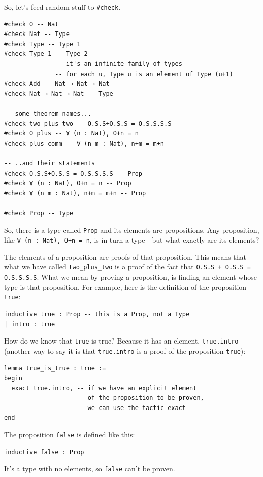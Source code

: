 \documentclass[oneside]{book}
\theoremstyle{definition}
\theoremstyle{remark}
\theoremstyle{plain}
\begin{document}
So, let's feed random stuff to \lstinline{#check}.
\begin{lstlisting}
#check O -- Nat
#check Nat -- Type
#check Type -- Type 1
#check Type 1 -- Type 2
              -- it's an infinite family of types
              -- for each u, Type u is an element of Type (u+1)
#check Add -- Nat → Nat → Nat
#check Nat → Nat → Nat -- Type

-- some theorem names...
#check two_plus_two -- O.S.S+O.S.S = O.S.S.S.S
#check O_plus -- ∀ (n : Nat), O+n = n
#check plus_comm -- ∀ (n m : Nat), n+m = m+n

-- ..and their statements
#check O.S.S+O.S.S = O.S.S.S.S -- Prop
#check ∀ (n : Nat), O+n = n -- Prop
#check ∀ (n m : Nat), n+m = m+n -- Prop

#check Prop -- Type
\end{lstlisting}
So, there is a type called \lstinline{Prop} and its elements are propositions.
Any proposition, like \lstinline{∀ (n : Nat), O+n = n}, is in turn a type - but what exactly are its elements?

The elements of a proposition are proofs of that proposition.
This means that what we have called \lstinline{two_plus_two} is a proof of the fact that \lstinline{O.S.S + O.S.S = O.S.S.S.S}.
What we mean by proving a proposition, is finding an element whose type is that proposition.
For example, here is the definition of the proposition \lstinline{true}:
\begin{lstlisting}
inductive true : Prop -- this is a Prop, not a Type
| intro : true    
\end{lstlisting}
How do we know that \lstinline{true} is true? Because it has an element, \lstinline{true.intro}
(another way to say it is that \lstinline{true.intro} is a proof of the proposition \lstinline{true}):
\begin{lstlisting}
lemma true_is_true : true :=
begin
  exact true.intro, -- if we have an explicit element
                    -- of the proposition to be proven,
                    -- we can use the tactic exact
end
\end{lstlisting}

The proposition \lstinline{false} is defined like this:
\begin{lstlisting}
inductive false : Prop  
\end{lstlisting}
It's a type with no elements, so \lstinline{false} can't be proven.
\end{document}
